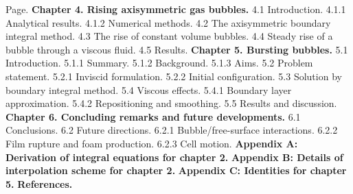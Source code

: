 \pg
\vbox{
\obeylines
\vskip 33pt
\hfill Page.
\vskip 5pt
{\bf Chapter 4. Rising axisymmetric gas bubbles.}
4.1 Introduction.
\itemitem {} 4.1.1 Analytical results. 
\itemitem {} 4.1.2 Numerical methods. 
4.2 The axisymmetric boundary integral method. 
4.3 The rise of constant volume bubbles. 
4.4 Steady rise of a bubble through a viscous fluid. 
4.5 Results. 
\vskip 5pt
{\bf Chapter 5. Bursting bubbles.}
5.1 Introduction.
\itemitem{} 5.1.1 Summary. 
\itemitem{} 5.1.2 Background. 
\itemitem{} 5.1.3 Aims. 
5.2 Problem statement.
\itemitem{} 5.2.1 Inviscid formulation. 
\itemitem{} 5.2.2 Initial configuration. 
5.3 Solution by boundary integral method. 
5.4 Viscous effects.
\itemitem{} 5.4.1 Boundary layer approximation. 
\itemitem{} 5.4.2 Repositioning and smoothing. 
5.5 Results and discussion. 
\vskip 5pt
{\bf Chapter 6. Concluding remarks and future developments.}
6.1 Conclusions. 
6.2 Future directions.
\itemitem{} 6.2.1 Bubble/free-surface interactions. 
\itemitem{} 6.2.2 Film rupture and foam production. 
\itemitem{} 6.2.3 Cell motion. 
\vskip 5pt
{\bf Appendix A: Derivation of integral equations for chapter 2.}
\vskip 5pt
{\bf Appendix B: Details of interpolation scheme for chapter 2.}
\vskip 5pt
{\bf Appendix C: Identities for chapter 5.}
\vskip 5pt
{\bf References.}
}

